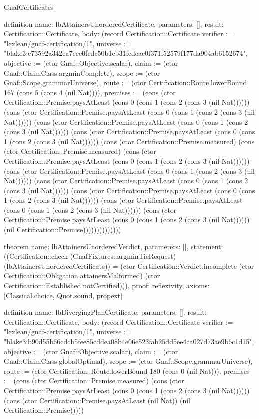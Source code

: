 \begin{lexlean}{GnafCertificates}
\begin{semanticmodule}
definition{
  name: lbAttainersUnorderedCertificate,
  parameters: [],
  result: Certification::Certificate,
  body: (record Certification::Certificate {verifier := "lexlean/gnaf-certification/1", universe := "blake3:c73592a342ea7cee0fcdc50b1eb31fedeac0f371f52579f177da904ab6152674", objective := (ctor Gnaf::Objective.scalar), claim := (ctor Gnaf::ClaimClass.argminComplete), scope := (ctor Gnaf::Scope.grammarUniverse), route := (ctor Certification::Route.lowerBound 167 (cons 5 (cons 4 (nil Nat)))), premises := (cons (ctor Certification::Premise.paysAtLeast (cons 0 (cons 1 (cons 2 (cons 3 (nil Nat)))))) (cons (ctor Certification::Premise.paysAtLeast (cons 0 (cons 1 (cons 2 (cons 3 (nil Nat)))))) (cons (ctor Certification::Premise.paysAtLeast (cons 0 (cons 1 (cons 2 (cons 3 (nil Nat)))))) (cons (ctor Certification::Premise.paysAtLeast (cons 0 (cons 1 (cons 2 (cons 3 (nil Nat)))))) (cons (ctor Certification::Premise.measured) (cons (ctor Certification::Premise.measured) (cons (ctor Certification::Premise.paysAtLeast (cons 0 (cons 1 (cons 2 (cons 3 (nil Nat)))))) (cons (ctor Certification::Premise.paysAtLeast (cons 0 (cons 1 (cons 2 (cons 3 (nil Nat)))))) (cons (ctor Certification::Premise.paysAtLeast (cons 0 (cons 1 (cons 2 (cons 3 (nil Nat)))))) (cons (ctor Certification::Premise.paysAtLeast (cons 0 (cons 1 (cons 2 (cons 3 (nil Nat)))))) (cons (ctor Certification::Premise.paysAtLeast (cons 0 (cons 1 (cons 2 (cons 3 (nil Nat)))))) (cons (ctor Certification::Premise.paysAtLeast (cons 0 (cons 1 (cons 2 (cons 3 (nil Nat)))))) (nil Certification::Premise)))))))))))))})
}

theorem{
  name: lbAttainersUnorderedVerdict,
  parameters: [],
  statement: ((Certification::check (GnafFixtures::argminTieRequest) (lbAttainersUnorderedCertificate)) = (ctor Certification::Verdict.incomplete (ctor Certification::Obligation.attainersMalformed) (ctor Certification::Established.notCertified))),
  proof: reflexivity{},
  axioms: [Classical.choice, Quot.sound, propext]
}

definition{
  name: lbDivergingPlanCertificate,
  parameters: [],
  result: Certification::Certificate,
  body: (record Certification::Certificate {verifier := "lexlean/gnaf-certification/1", universe := "blake3:b90d55b66cdcb5fee85cddea08b4e06e523fab25dd5ee4ca027d73ae9b6c1d15", objective := (ctor Gnaf::Objective.scalar), claim := (ctor Gnaf::ClaimClass.globalOptimal), scope := (ctor Gnaf::Scope.grammarUniverse), route := (ctor Certification::Route.lowerBound 180 (cons 0 (nil Nat))), premises := (cons (ctor Certification::Premise.measured) (cons (ctor Certification::Premise.paysAtLeast (cons 0 (cons 1 (cons 2 (cons 3 (nil Nat)))))) (cons (ctor Certification::Premise.paysAtLeast (nil Nat)) (nil Certification::Premise))))})
}


\end{semanticmodule}
\end{lexlean}
